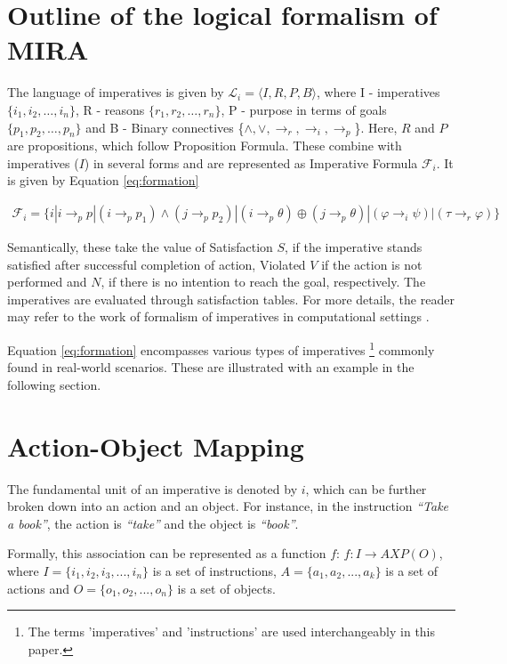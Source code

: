 \documentclass[a4paper,11pt]{lmcs}
\begin{document}
\section{Outline of the logical formalism of MIRA}
\label{sec:mira}
The language of imperatives is given by $\mathcal{L}_i = \langle I,R,P,B\rangle$, where
I - imperatives \( \{ i_1, i_2, \ldots, i_n \} \), R - reasons \( \{ r_1, r_2, \ldots, r_n \} \), P - purpose in terms of goals \( \{ p_1, p_2, \ldots, p_n \} \) and B - Binary connectives \{$\wedge,\vee, \rightarrow_r, \rightarrow_i, \rightarrow_p$\}. Here, $R$ and $P$ are propositions, which follow Proposition Formula. These combine with imperatives ($I$) in several forms and are represented as Imperative Formula $\mathcal{F}_i$. It is given by Equation \ref{eq:formation}

\begin{eqnarray}
\label{eq:formation}
 \mathcal{F}_i = \{i|i \rightarrow_p p| (i \rightarrow_p p_1) \wedge (j \rightarrow_p p_2)|(i \rightarrow_p \theta) \oplus (j \rightarrow_p \theta)|(\varphi \rightarrow_i \psi)| (\tau \rightarrow_r \varphi)
\}
\end{eqnarray}


Semantically, these take the value of Satisfaction $S$, if the imperative stands satisfied after successful completion of action, Violated $V$ if the action is not performed and $N$, if there is no intention to reach the goal, respectively. The imperatives are evaluated through satisfaction tables. For more details, the reader may refer to the work of formalism of imperatives in computational settings \cite{mira}.

Equation \ref{eq:formation} encompasses various types of imperatives \footnote{The terms 'imperatives' and 'instructions' are used interchangeably in this paper.} commonly found in real-world scenarios. These are illustrated with an example in the following section.

\section{Action-Object Mapping}
\label{sec:class}
The fundamental unit of an imperative is denoted by $i$, which can be further broken down into an action and an object.
For instance, in the instruction \textit{``Take a book''}, the action is \textit{``take''} and the object is \textit{``book''}.

Formally, this association can be represented as a function $f$:
$f:I\rightarrow A X P(O)$, where $I = \{i_1,i_2,i_3,...,i_n\}$ is a set of instructions, $A = \{a_1,a_2,...,a_k\}$ is a set of actions and $O = \{o_1,o_2,...,o_n\}$ is a set of objects.
\end{document}
